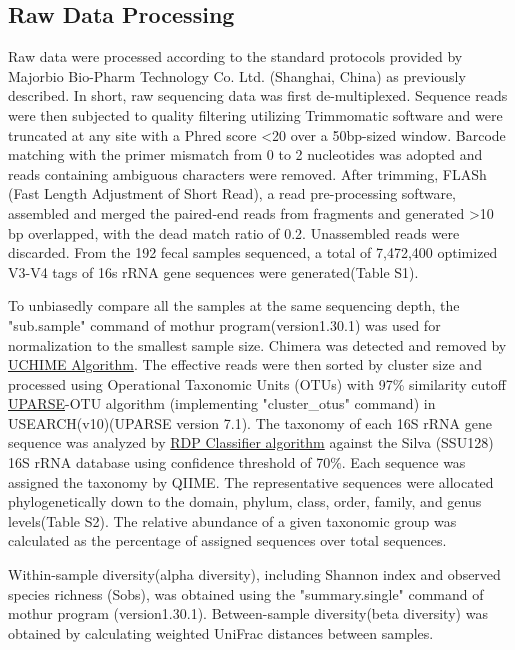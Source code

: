 \documentclass[fleqn,10pt]{wlpeerj} %
\begin{document}
  \subsection*{Raw Data Processing}
  Raw data were processed according to the standard protocols provided by Majorbio Bio-Pharm Technology Co. Ltd. (Shanghai, China) as previously described\citep{liu2018splenectomy, wang2018bacterial}. In short, raw sequencing data was first de-multiplexed. Sequence reads were then subjected to quality filtering utilizing Trimmomatic software\citep{bolger2014trimmomatic} and were truncated at any site with a Phred score \textless 20 over a 50bp-sized window. Barcode matching with the primer mismatch from 0 to 2 nucleotides was adopted and reads containing ambiguous characters were removed. After trimming, FLASh (Fast Length Adjustment of Short Read)\citep{magovc2011flash}, a read pre-processing software, assembled and merged the paired-end reads from fragments and generated \textgreater 10 bp overlapped, with the dead match ratio of 0.2. Unassembled reads were discarded. From the 192 fecal samples sequenced, a total of 7,472,400 optimized V3-V4 tags of 16s rRNA gene sequences were generated(Table S1).

  To unbiasedly compare all the samples at the same sequencing depth, the "sub.sample" command of mothur program(version1.30.1)\citep{schloss2009introducing} was used for normalization to the smallest sample size. Chimera was detected and removed by \href{https://www.drive5.com/usearch/manual/uchime_algo.html}{UCHIME Algorithm}. The effective reads were then sorted by cluster size and processed using Operational Taxonomic Units (OTUs) with 97\% similarity cutoff \href{http://drive5Tcom/uparse/}{UPARSE}-OTU algorithm (implementing "cluster\_otus" command)\citep{edgar2013uparse} in USEARCH(v10)(UPARSE version 7.1). The taxonomy of each 16S rRNA gene sequence was analyzed by \href{http://rdp.cme.msu.edu/}{RDP Classifier algorithm}\citep{wang2007naive} against the Silva (SSU128) 16S rRNA database\citep{quast2012silva} using confidence threshold of 70\%. Each sequence was assigned the taxonomy by QIIME\citep{caporaso2010qiime}. The representative sequences were allocated phylogenetically down to the domain, phylum, class, order, family, and genus levels(Table S2). The relative abundance of a given taxonomic group was calculated as the percentage of assigned sequences over total sequences.

   Within-sample diversity(alpha diversity), including Shannon index and observed species richness (Sobs), was obtained using the "summary.single" command of mothur program (version1.30.1)\citep{schloss2009introducing}. Between-sample diversity(beta diversity) was obtained by calculating weighted UniFrac distances between samples.
\end{document}
